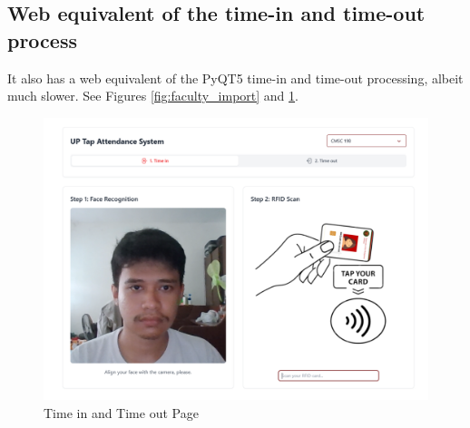 \subsection{Web equivalent of the time-in and time-out process}
It also has a web equivalent of the PyQT5 time-in and time-out processing, albeit much slower. See Figures \ref{fig:faculty_import} and \ref{fig:frontend}.
\begin{figure}[h] %
	\centering
	\includegraphics[width=1.0\textwidth]{figures/chapter4/frontend.png} %
	\caption{Time in and Time out Page}
	\label{fig:frontend}
\end{figure}

